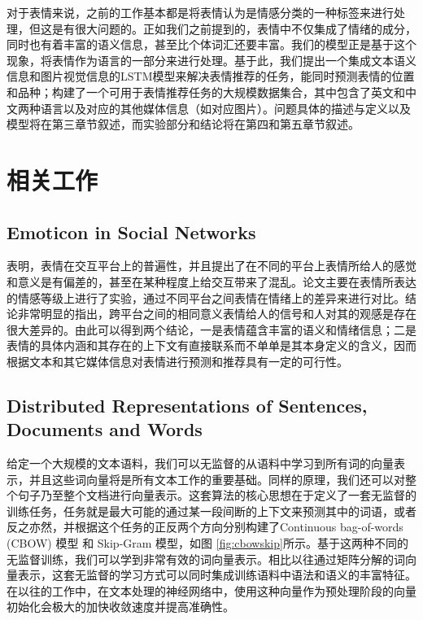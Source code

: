 \documentclass[10pt, titlepage]{article}
\begin{document}
对于表情来说，之前的工作基本都是将表情认为是情感分类的一种标签来进行处理，但这是有很大问题的。正如我们之前提到的，表情中不仅集成了情绪的成分，同时也有着丰富的语义信息，甚至比个体词汇还要丰富。我们的模型正是基于这个现象，将表情作为语言的一部分来进行处理。基于此，我们提出一个集成文本语义信息和图片视觉信息的LSTM模型来解决表情推荐的任务，能同时预测表情的位置和品种；构建了一个可用于表情推荐任务的大规模数据集合，其中包含了英文和中文两种语言以及对应的其他媒体信息（如对应图片）。问题具体的描述与定义以及模型将在第三章节叙述，而实验部分和结论将在第四和第五章节叙述。


\section{相关工作}
	\subsection{Emoticon in Social Networks}

	\cite{miller2016blissfully}表明，表情在交互平台上的普遍性，并且提出了在不同的平台上表情所给人的感觉和意义是有偏差的，甚至在某种程度上给交互带来了混乱。论文主要在表情所表达的情感等级上进行了实验，通过不同平台之间表情在情绪上的差异来进行对比。结论非常明显的指出，跨平台之间的相同意义表情给人的信号和人对其的观感是存在很大差异的。由此可以得到两个结论，一是表情蕴含丰富的语义和情绪信息；二是表情的具体内涵和其存在的上下文有直接联系而不单单是其本身定义的含义，因而根据文本和其它媒体信息对表情进行预测和推荐具有一定的可行性。

	\subsection{Distributed Representations of Sentences, Documents and Words}

		给定一个大规模的文本语料，我们可以无监督的从语料中学习到所有词的向量表示，并且这些词向量将是所有文本工作的重要基础。同样的原理，我们还可以对整个句子乃至整个文档进行向量表示。这套算法的核心思想在于定义了一套无监督的训练任务，任务就是最大可能的通过某一段间断的上下文来预测其中的词语，或者反之亦然\cite{mikolov2013distributed}，并根据这个任务的正反两个方向分别构建了Continuous bag-of-words (CBOW) 模型\cite{mikolov2013efficient} 和 Skip-Gram \cite{mikolov2013linguistic} 模型，如图 \ref{fig:cbowskip}所示。基于这两种不同的无监督训练，我们可以学到非常有效的词向量表示。相比以往通过矩阵分解的词向量表示，这套无监督的学习方式可以同时集成训练语料中语法和语义的丰富特征。在以往的工作中，在文本处理的神经网络中，使用这种向量作为预处理阶段的向量初始化会极大的加快收敛速度并提高准确性\cite{erhan2010does}。
		
\end{document}
